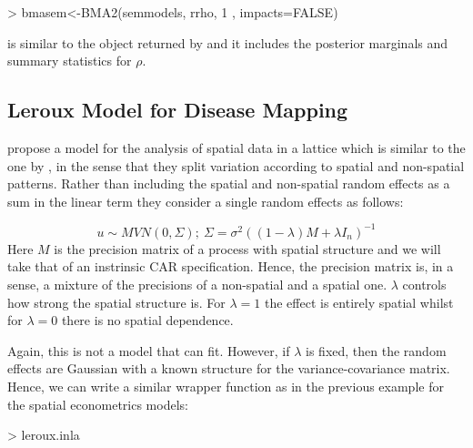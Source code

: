 \documentclass[article]{jss}
\begin{document}
\begin{Schunk}
\begin{Sinput}
> bmasem<-BMA2(semmodels, rrho, 1 , impacts=FALSE)
\end{Sinput}
\end{Schunk}

 is similar to the object returned by  and it
includes the posterior marginals and summary statistics for $\rho$.


\subsection{Leroux Model for Disease Mapping}

\citet{Lerouxetal:1999} propose a model for the analysis of spatial data in a
lattice which is similar to the one by \citet{besagetal:1991}, in the sense
that they split variation according to  spatial and non-spatial patterns.
Rather than including the spatial and non-spatial random effects as a sum in
the linear term they consider a single random effects as follows:

$$
u \sim MVN(0, \Sigma);\ \Sigma=\sigma^2 ((1-\lambda) M+\lambda I_n)^{-1}
$$
\noindent
Here $M$ is the precision matrix of a process with spatial structure and we
will take that of an instrinsic CAR specification. Hence, the precision matrix
is, in a sense, a mixture of the precisions of a non-spatial and a spatial
one. $\lambda$ controls how strong the spatial structure is. For $\lambda=1$
the effect is entirely spatial whilst for $\lambda=0$ there is no spatial
dependence.

Again, this is not a model that  can fit. However, if  $\lambda$
is fixed, then the random effects are Gaussian with a known structure for the
variance-covariance matrix. Hence, we can write a similar wrapper function
as in the previous example for the spatial econometrics models:



\begin{Schunk}
\begin{Sinput}
> leroux.inla
\end{Sinput}
\end{Schunk}
\end{document}
